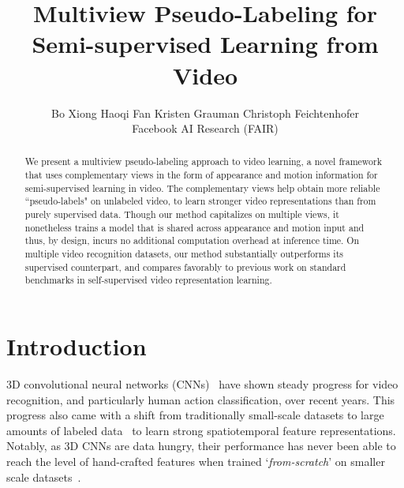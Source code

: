 \documentclass[10pt,twocolumn,letterpaper]{article}
\begin{document}
\def\OURS{Multiview  Pseudo-Labeling\xspace}
\def\ours{multiview  pseudo-labeling\xspace}
\def\oursshort{MvPL\xspace}
\def\OURSFULL{?\xspace}

\title{ Multiview Pseudo-Labeling for  Semi-supervised Learning from Video}



\author{
	Bo Xiong \qquad
	Haoqi Fan \qquad
	Kristen Grauman \qquad
	Christoph Feichtenhofer \vspace{.8em}\\
	Facebook AI Research (FAIR)
		\vspace{.6em}
}

\maketitle


\begin{abstract}
  We present a multiview  pseudo-labeling approach to video learning, a novel framework that uses complementary views in the form of appearance and motion information for semi-supervised learning in video. The complementary views help obtain more reliable ``pseudo-labels" on unlabeled video, to learn stronger video representations than from purely supervised data. 
  Though our method capitalizes on multiple views, it nonetheless trains a  model that is shared across appearance and motion input and thus, by design, incurs no additional computation overhead at inference time. On multiple video recognition datasets, our method substantially outperforms its supervised counterpart, and compares favorably to previous work on standard benchmarks in self-supervised video representation learning.
\end{abstract}







\vspace{5pt}
\section{Introduction}\label{sec:introduction}
\vspace{5pt}

3D convolutional neural networks (CNNs)~\cite{tran2015learning, carreira2017quo, tran2018closer, feichtenhofer2019slowfast} have shown steady progress for video recognition, and  
{particularly} human action classification, over recent years. This progress also came with a shift from traditionally small-scale datasets to large amounts of labeled data~\cite{kay2017kinetics,carreira2018short,carreira2019short} to learn strong spatiotemporal
feature representations. Notably, as 3D CNNs are data hungry, their performance has never been able to reach the level of hand-crafted features \cite{wang2013action} when trained `\textit{from-scratch}' on smaller scale datasets~\cite{simonyan2014two}. 
\end{document}
